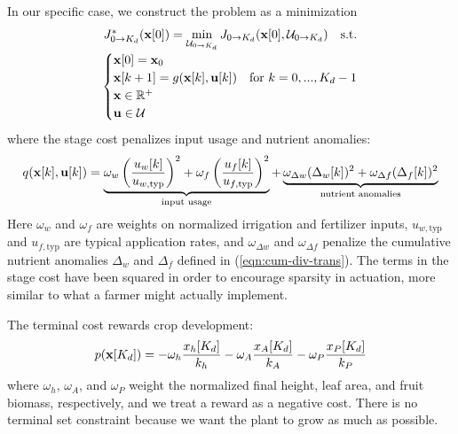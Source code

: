 \documentclass[preprint,12pt]{elsarticle}
\newcommand{\df}[2]{\displaystyle\frac{#1}{#2}}
\begin{document}
In our specific case, we construct the problem as a minimization
\begin{equation}
\begin{array}{c}
J_{0\to K_{d}}^{*}({\bf x}[0]) = \min\limits_{\mathcal{U}_{0\to K_{d}}} J_{0\to K_{d}}({\bf x}[0], \mathcal{U}_{0\to K_{d}}) \quad \text{s.t.} \\[7pt]
\begin{cases}
{\bf x}[0] = {\bf x}_{0} \\
{\bf x}[k+1] = g({\bf x}[k], {\bf u}[k]) & \text{for } k=0,...,K_{d}-1 \\
{\bf x}\in\mathbb{R}^{+} \\
{\bf u}\in{\mathcal{U}}
\end{cases}
\end{array}
\label{eqn:minimization-cftoc}
\end{equation}
where the stage cost penalizes input usage and nutrient anomalies:
\begin{equation}
q({\bf x}[k], {\bf u}[k]) =
\underbrace{\omega_{w}\left( \df{u_{w}[k]}{u_{w,\text{typ}}} \right)^{2} +
\omega_{f}\left( \df{u_{f}[k]}{u_{f,\text{typ}}} \right)^{2}}_{\text{input usage}} +
\underbrace{\omega_{\Delta w}(\Delta_{w}[k])^{2} +
\omega_{\Delta f}(\Delta_{f}[k])^{2}}_{\text{nutrient anomalies}}
\label{eqn:stage-cost}
\end{equation}
Here $\omega_w$ and $\omega_f$ are weights on normalized irrigation and fertilizer inputs, $u_{w,\text{typ}}$ and $u_{f,\text{typ}}$ are typical application rates, and $\omega_{\Delta w}$ and $\omega_{\Delta f}$ penalize the cumulative nutrient anomalies $\Delta_w$ and $\Delta_f$ defined in (\ref{eqn:cum-div-trans}). The terms in the stage cost have been squared in order to encourage sparsity in actuation, more similar to what a farmer might actually implement.

The terminal cost rewards crop development:
\begin{equation}
p({\bf x}[K_{d}]) =
-\omega_{h}\df{x_{h}[K_{d}]}{k_{h}} -
\omega_{A}\df{x_{A}[K_{d}]}{k_{A}} -
\omega_{P}\df{x_{P}[K_{d}]}{k_{P}}
\label{eqn:terminal-cost}
\end{equation}
where $\omega_h$, $\omega_A$, and $\omega_P$ weight the normalized final height, leaf area, and fruit biomass, respectively, and we treat a reward as a negative cost. There is no terminal set constraint because we want the plant to grow as much as possible.

\end{document}
